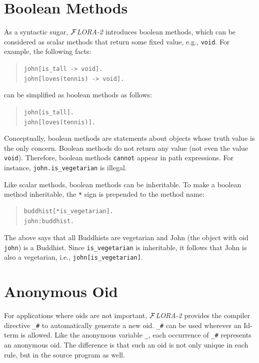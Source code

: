 \documentclass[11pt]{article}
\newcommand{\FLORA}{{\mbox{${\cal F}${\small\it LORA}\rm\emph{-2}}}\xspace}
\begin{document}
\section{Boolean Methods}


%
As a syntactic sugar, \FLORA introduces boolean methods, which can be
considered as scalar methods that return some fixed value, e.g.,
{\tt void}. For example, the following facts:
\begin{quote}
\verb|john[is_tall -> void].| \\
\verb|john[loves(tennis) -> void].|
\end{quote}
can be simplified as boolean methods as follows:
\begin{quote}
\verb|john[is_tall].| \\
\verb|john[loves(tennis)].|
\end{quote}

Conceptually, boolean methods are statements about objects whose truth
value is the only concern. Boolean methods do not return any value (not
even the value {\tt void}). Therefore, boolean methods {\tt cannot} appear
in path expressions. For instance, \mbox{\tt john.is\_vegetarian} is
illegal.

Like scalar methods, boolean methods can be inheritable. To make a
boolean method inheritable, the \verb|*| sign is prepended to
the method name:
\begin{quote}
\begin{verbatim}
buddhist[*is_vegetarian].
john:buddhist.
\end{verbatim}
\end{quote}
The above says that all Buddhists are vegetarian and John (the object with
oid {\tt john}) is a Buddhist. Since \verb|is_vegetarian| is inheritable,
it follows that John is also a vegetarian, i.e.,
\verb|john[is_vegetarian]|.


\section{Anonymous Oid}


%
For applications where oids are not important, \FLORA provides the
compiler directive \verb|_#| to automatically generate a new
oid. \verb|_#| can be used wherever an Id-term is allowed. Like the
anonymous variable \verb|_|, each occurrence of \verb|_#| represents
an anonymous oid. The difference is that such an oid is not only
unique in each rule, but in the source program as well.
\end{document}
